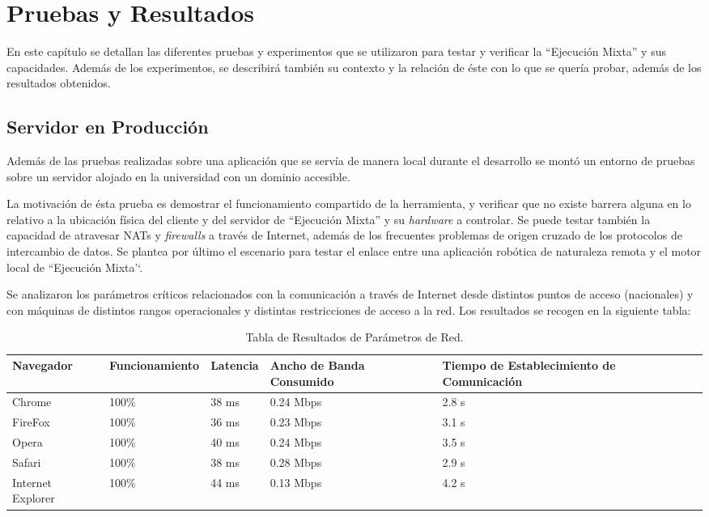 \chapter{ Pruebas y Resultados}

En este capítulo se detallan las diferentes pruebas y experimentos que se utilizaron para testar y verificar la ``Ejecución Mixta'' y sus capacidades. Además de los experimentos, se describirá también su contexto y la relación de éste con lo que se quería probar, además de los resultados obtenidos.

\section{Servidor en Producción}  
Además de las pruebas realizadas sobre una aplicación que se servía de manera local durante el desarrollo se montó un entorno de pruebas sobre un servidor alojado en la universidad con un dominio accesible.

La motivación de ésta prueba es demostrar el funcionamiento compartido de la herramienta, y verificar que no existe barrera alguna en lo relativo a la ubicación física del cliente y del servidor de ``Ejecución Mixta'' y su \textit{hardware} a controlar. Se puede testar también la capacidad de atravesar NATs y \textit{firewalls} a través de Internet, además de los frecuentes problemas de origen cruzado de los protocolos de intercambio de datos. Se plantea por último el escenario para testar el enlace entre una aplicación robótica de naturaleza remota y el motor local de ``Ejecución Mixta'`.

Se analizaron los parámetros críticos relacionados con la comunicación a través de Internet desde distintos puntos de acceso (nacionales) y con máquinas de distintos rangos operacionales y distintas restricciones de acceso a la red. Los resultados se recogen en la siguiente tabla:

\begin{table}[htbp]
\begin{center}
\begin{tabular}{| p{1.8cm}| p{2.6cm} | p{1.7cm}| p{2.4cm}| p{3cm}|}
\hline
Navegador & Funcionamiento & Latencia & Ancho de Banda Consumido & Tiempo de Establecimiento de Comunicación \\
\hline \hline
Chrome & 100\% & 38 ms & 0.24 Mbps & 2.8 s\\ \hline
FireFox & 100\% & 36 ms & 0.23 Mbps & 3.1 s\\ \hline
Opera & 100\% & 40 ms & 0.24 Mbps & 3.5 s\\ \hline
Safari & 100\% & 38 ms & 0.28 Mbps & 2.9 s\\ \hline
Internet Explorer & 100\% & 44 ms & 0.13 Mbps & 4.2 s\\ \hline
\end{tabular}
\caption{Tabla de Resultados de Parámetros de Red.}
\label{tabla:pros_cons}
\end{center}
\end{table}

